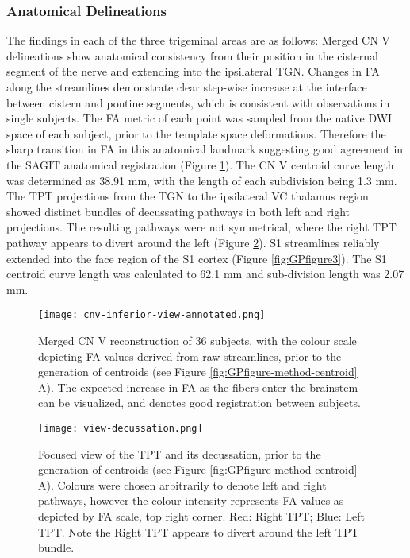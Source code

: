 \subsubsection{Anatomical Delineations}
The findings in each of the three trigeminal areas are as follows: Merged CN V delineations show anatomical consistency from their position in the cisternal segment of the nerve and extending into the ipsilateral TGN. Changes in FA along the streamlines demonstrate clear step-wise increase at the interface between cistern and pontine segments, which is consistent with observations in single subjects. The FA metric of each point was sampled from the native DWI space of each subject, prior to the template space deformations. Therefore the sharp transition in FA in this anatomical landmark suggesting good agreement in the SAGIT anatomical registration (Figure \ref{fig:GPfigure1}). The CN V centroid curve length was determined as 38.91 mm, with the length of each subdivision being 1.3 mm.
The TPT projections from the TGN to the ipsilateral VC thalamus region showed distinct bundles of decussating pathways in both left and right projections. The resulting pathways were not symmetrical, where the right TPT pathway appears to divert around the left (Figure \ref{fig:GPfigure2}).
S1 streamlines reliably extended into the face region of the S1 cortex (Figure \ref{fig:GPfigure3}). The S1 centroid curve length was calculated to 62.1 mm and sub-division length was 2.07 mm.

\begin{figure}[ht]
\centering
\texttt{[image: cnv-inferior-view-annotated.png]}
\caption{Merged CN V reconstruction of 36 subjects, with the colour scale depicting FA values derived from raw streamlines, prior to the generation of centroids (see Figure \ref{fig:GPfigure-method-centroid} A). The expected increase in FA as the fibers enter the brainstem can be visualized, and denotes good registration between subjects. }
\label{fig:GPfigure1}
\end{figure}

\begin{figure}[ht]
\centering
\texttt{[image: view-decussation.png]}
\caption{Focused view of the TPT and its decussation, prior to the generation of centroids (see Figure \ref{fig:GPfigure-method-centroid} A). Colours were chosen arbitrarily to denote left and right pathways, however the colour intensity represents FA values as depicted by FA scale, top right corner. Red: Right TPT; Blue: Left TPT. Note the Right TPT appears to divert around the left TPT bundle. }
\label{fig:GPfigure2}
\end{figure}

